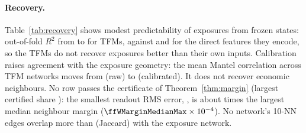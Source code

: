\documentclass[letterpaper]{article} %
\theoremstyle{definition}
\begin{document}
\begin{table}[t]
  \centering\small\setlength{\tabcolsep}{4pt}
  \resizebox{\columnwidth}{!}{}
  \caption{Exposure recovery on the training window. $R^2$: out-of-fold
    readout of risk-scaled exposures. Raw and Cal.: Spearman Mantel
    correlation of raw and calibrated distances with exposure distance
    (Fern\'andez joint: \ffWJointMantelExposure).}
  \label{tab:recovery}
\end{table}

\paragraph{Recovery.} Table~\ref{tab:recovery} shows modest predictability of
exposures from frozen states: out-of-fold $R^2$ from \ffWFmRsqMin{} to
\ffWFmRsqMax{} for TFMs, against \ffWDirectRsqHist{} and \ffWDirectRsqXbrl{}
for the direct features they encode, so the TFMs do not recover exposures
better than their own inputs. Calibration raises agreement with the exposure
geometry: the mean Mantel correlation across TFM networks moves from
\ffWFmMantelRawMean{} (raw) to \ffWFmMantelCalMean{} (calibrated). It does not
recover economic neighbours. No row passes the certificate of
Theorem~\ref{thm:margin} (largest certified share \ffWCertifiedMax): the
smallest readout RMS error, \ffWRmsErrorMin, is about \ffWErrorMarginRatio{}
times the largest median neighbour margin ($\ffWMarginMedianMax\times10^{-4}$).
No network's 10-NN edges overlap more than \ffWJaccardMax{} (Jaccard) with
the exposure network.

\begin{table}[t]
  \centering\small\setlength{\tabcolsep}{3.5pt}
  
  \caption{Out-of-sample change in mean Gaussian log score per issuer-month
    ($\times10^{3}$) of spatial APT against APT, 2021--2025. Positive favours
    the spatial model. $^{*}$Holm $p<0.05$; $^{\dagger}$unadjusted 95\% interval
    excludes zero.}
  \label{tab:apt}
\end{table}

\begin{table}[t]
  \centering\small
  
  \caption{Reference models. $\Delta$ score as in Table~\ref{tab:apt}; GMV
    vol.: annualised realised volatility of the minimum-variance portfolio.}
  \label{tab:baselines}
\end{table}
\end{document}
